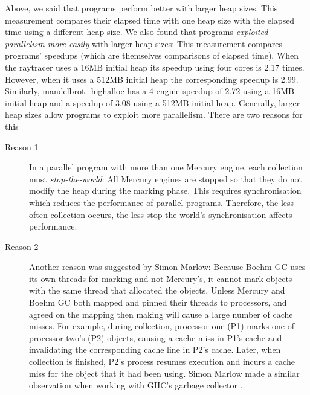 Above, we said that programs perform better with larger heap sizes.
This measurement compares their elapsed time with one heap
size with the elapsed time using a different heap size.
We also found that programs \emph{exploited parallelism more easily} with
larger heap sizes:
This measurement compares programs' speedups (which are themselves
comparisons of elapsed time).
When the raytracer uses a 16MB initial heap its speedup using four
cores is 2.17 times.
However, when it uses a 512MB initial heap the corresponding speedup is
2.99.
Similarly,
mandelbrot\_highalloc has a 4-engine speedup of 2.72 using a 16MB initial
heap and a speedup of 3.08 using a 512MB initial heap.
Generally,
larger heap sizes allow programs to exploit more parallelism.
There are two reasons for this

\begin{description}

    \item[Reason 1]
    In a parallel program with more than one Mercury engine,
    each collection must \emph{stop-the-world}:
    All Mercury engines are stopped so that they do not modify the heap during
    the marking phase.
    This requires synchronisation which reduces the performance of parallel
    programs.
    Therefore, the less often collection occurs, the less stop-the-world's
    synchronisation affects performance.

    \item[Reason 2]
    Another reason was suggested by Simon Marlow:
    Because Boehm GC uses its own threads for marking and not Mercury's,
    it cannot mark objects with the same thread that allocated the objects.
    Unless Mercury and Boehm GC both mapped and pinned their threads to
    processors,
    and agreed on the mapping then making will cause a large number of cache
    misses.
    For example, during collection, processor one (P1) marks one of processor two's
    (P2) objects,
    causing a cache miss in P1's cache and invalidating the corresponding cache
    line in P2's cache.
    Later, when collection is finished,
    P2's process resumes execution and incurs a cache miss for the object that
    it had been using.
    Simon Marlow made a similar observation when working with GHC's garbage
    collector \cite{marlow-gc}.

\end{description}

